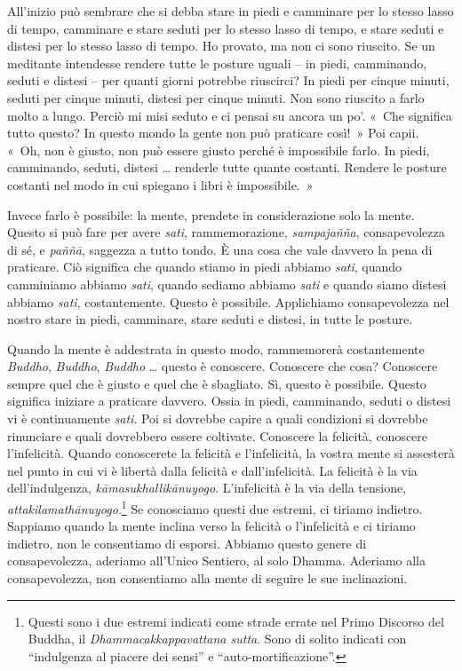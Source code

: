 All'inizio può sembrare che si debba stare in piedi e camminare per lo
stesso lasso di tempo, camminare e stare seduti per lo stesso lasso di
tempo, e stare seduti e distesi per lo stesso lasso di tempo. Ho
provato, ma non ci sono riuscito. Se un meditante intendesse rendere
tutte le posture uguali -- in piedi, camminando, seduti e distesi -- per
quanti giorni potrebbe riuscirci? In piedi per cinque minuti, seduti per
cinque minuti, distesi per cinque minuti. Non sono riuscito a farlo
molto a lungo. Perciò mi misi seduto e ci pensai su ancora un po'. «~Che
significa tutto questo? In questo mondo la gente non può praticare
così!~» Poi capii. «~Oh, non è giusto, non può essere giusto perché è
impossibile farlo. In piedi, camminando, seduti, distesi \ldots{} renderle
tutte quante costanti. Rendere le posture costanti nel modo in cui
spiegano i libri è impossibile.~»

Invece farlo è possibile: la mente, prendete in considerazione solo la
mente. Questo si può fare per avere \emph{sati}, rammemorazione,
\emph{sampajañña}, consapevolezza di sé, e \emph{paññā}, saggezza a
tutto tondo. È una cosa che vale davvero la pena di praticare. Ciò
significa che quando stiamo in piedi abbiamo \emph{sati}, quando
camminiamo abbiamo \emph{sati}, quando sediamo abbiamo \emph{sati} e
quando siamo distesi abbiamo \emph{sati}, costantemente. Questo è
possibile. Applichiamo consapevolezza nel nostro stare in piedi,
camminare, stare seduti e distesi, in tutte le posture.

Quando la mente è addestrata in questo modo, rammemorerà costantemente
\emph{Buddho}, \emph{Buddho}, \emph{Buddho} \ldots{} questo è conoscere.
Conoscere che cosa? Conoscere sempre quel che è giusto e quel che è
sbagliato. Sì, questo è possibile. Questo significa iniziare a praticare
davvero. Ossia in piedi, camminando, seduti o distesi vi è continuamente
\emph{sati}. Poi si dovrebbe capire a quali condizioni si dovrebbe
rinunciare e quali dovrebbero essere coltivate. Conoscere la felicità,
conoscere l'infelicità. Quando conoscerete la felicità e l'infelicità,
la vostra mente si assesterà nel punto in cui vi è libertà dalla
felicità e dall'infelicità. La felicità è la via dell'indulgenza,
\emph{kāmasukhallikānuyogo}. L'infelicità è la via della tensione,
\emph{attakilamathānuyogo}.\footnote{Questi sono i due estremi indicati
  come strade errate nel Primo Discorso del Buddha, il
  \emph{Dhammacakkappavattana sutta}. Sono di solito indicati con
  ``indulgenza al piacere dei sensi'' e ``auto-mortificazione''.} Se
conosciamo questi due estremi, ci tiriamo indietro. Sappiamo quando la
mente inclina verso la felicità o l'infelicità e ci tiriamo indietro,
non le consentiamo di esporsi. Abbiamo questo genere di consapevolezza,
aderiamo all'Unico Sentiero, al solo Dhamma. Aderiamo alla
consapevolezza, non consentiamo alla mente di seguire le sue
inclinazioni.

